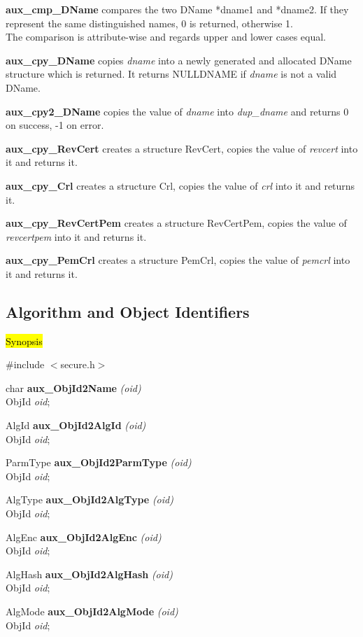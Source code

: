 {\bf aux\_cmp\_DName} compares the two DName *dname1 and *dname2.
If they represent the same distinguished names,
0 is returned, otherwise 1. \\
The comparison is attribute-wise
and regards upper and lower cases equal.

{\bf aux\_cpy\_DName} copies {\em dname} into a newly generated and
allocated DName structure which is returned. It returns NULLDNAME
if {\em dname} is not a valid DName.

{\bf aux\_cpy2\_DName} copies the value of {\em dname} into {\em dup\_dname}
and returns 0 on success, -1 on error.

{\bf aux\_cpy\_RevCert} creates a structure RevCert, copies the value
of {\em revcert} into it and returns it.

{\bf aux\_cpy\_Crl} creates a structure Crl, copies the value
of {\em crl} into it and returns it.

{\bf aux\_cpy\_RevCertPem} creates a structure RevCertPem, copies the value
of {\em revcertpem} into it and returns it.

{\bf aux\_cpy\_PemCrl} creates a structure PemCrl, copies the value
of {\em pemcrl} into it and returns it.



\subsection{Algorithm and Object Identifiers}
\label{aux_aid}
\hl{Synopsis}

\#include $<$secure.h$>$ 

char {\bf *aux\_ObjId2Name} {\em (oid)} \\
ObjId {\em *oid};

AlgId {\bf *aux\_ObjId2AlgId} {\em (oid)}  \\
ObjId {\em *oid};

ParmType {\bf aux\_ObjId2ParmType} {\em (oid)} \\
ObjId {\em *oid};

AlgType {\bf aux\_ObjId2AlgType} {\em (oid)}  \\
ObjId {\em *oid};

AlgEnc {\bf aux\_ObjId2AlgEnc} {\em (oid)}  \\
ObjId {\em *oid};

AlgHash {\bf aux\_ObjId2AlgHash} {\em (oid)}  \\
ObjId {\em *oid};

AlgMode {\bf aux\_ObjId2AlgMode} {\em (oid)}  \\
ObjId {\em *oid};

